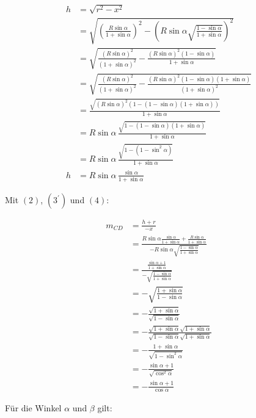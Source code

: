 \documentclass[12pt,a4paper,oneside]{article}
\begin{document}
\begin{align*}
	h &= \sqrt{r^2-x^2} \\
	&= \sqrt{\left(\frac{R\sin\alpha}{1+\sin\alpha}\right)^2 - \left(R\sin\alpha\sqrt{\frac{1-\sin\alpha}{1+\sin\alpha}}\right)^2} \\
	&= \sqrt{\frac{(R\sin\alpha)^2}{(1+\sin\alpha)^2} - \frac{(R\sin\alpha)^2(1-\sin\alpha)}{1+\sin\alpha}} \\
	&= \sqrt{\frac{(R\sin\alpha)^2}{(1+\sin\alpha)^2} - \frac{(R\sin\alpha)^2(1-\sin\alpha)(1+\sin\alpha)}{(1+\sin\alpha)^2}} \\
	&= \frac{\sqrt{(R\sin\alpha)^2(1-(1-\sin\alpha)(1+\sin\alpha))}}{1+\sin\alpha} \\
	&= R\sin\alpha \, \frac{\sqrt{1-(1-\sin\alpha)(1+\sin\alpha)}}{1+\sin\alpha} \\
	&= R\sin\alpha \, \frac{\sqrt{1-(1-\sin^2\alpha)}}{1+\sin\alpha} \\
	h &= R\sin\alpha \, \frac{\sin\alpha}{1+\sin\alpha} \tag{$3^\prime$}
\end{align*}

Mit $(2)$, $(3^\prime)$ und $(4)$:

\begin{align*}
	m_{CD} &= \frac{h+r}{-x} \\
	&= \frac{R\sin\alpha \frac{\sin\alpha}{1+\sin\alpha} + \frac{R\sin\alpha}{1+\sin\alpha}}{-R\sin\alpha\sqrt{\frac{1-\sin\alpha}{1+\sin\alpha}}} \\
	&= \frac{\frac{\sin\alpha+1}{1+\sin\alpha}}{-\sqrt{\frac{1-\sin\alpha}{1+\sin\alpha}}} \\
	&= -\sqrt{\frac{1+\sin\alpha}{1-\sin\alpha}} \\
	&= -\frac{\sqrt{1+\sin\alpha}}{\sqrt{1-\sin\alpha}} \\
	&= -\frac{\sqrt{1+\sin\alpha}\sqrt{1+\sin\alpha}}{\sqrt{1-\sin\alpha}\sqrt{1+\sin\alpha}} \\
	&= -\frac{1+\sin\alpha}{\sqrt{1 - \sin^2\alpha}} \\
	&= -\frac{\sin\alpha+1}{\sqrt{\cos^2\alpha}} \\
	&= -\frac{\sin\alpha+1}{\cos\alpha}
\end{align*}

\pagebreak
{}
Für die Winkel $\alpha$ und $\beta$ gilt:
\end{document}
